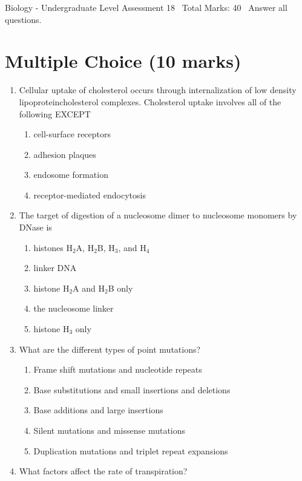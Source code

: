 \documentclass[12pt]{article}
\begin{document}
\begin{center}
Biology - Undergraduate Level Assessment 18 \
Total Marks: 40 \
Answer all questions.
\end{center}

\section*{Multiple Choice (10 marks)}
\begin{enumerate}[label=\arabic*.]
\item Cellular uptake of cholesterol occurs through internalization of low density lipoproteincholesterol complexes. Cholesterol uptake involves all of the following EXCEPT
\begin{enumerate}[label=(\alph*)]
    \item cell-surface receptors
    \item adhesion plaques
    \item endosome formation
    \item receptor-mediated endocytosis
\end{enumerate}
\item The target of digestion of a nucleosome dimer to nucleosome monomers by DNase is
\begin{enumerate}[label=(\alph*)]
    \item histones H$_{2}$A, H$_{2}$B, H$_{3}$, and H$_{4}$
    \item linker DNA
    \item histone H$_{2}$A and H$_{2}$B only
    \item the nucleosome linker
    \item histone H$_{3}$ only
\end{enumerate}
\item What are the different types of point mutations?
\begin{enumerate}[label=(\alph*)]
    \item Frame shift mutations and nucleotide repeats
    \item Base substitutions and small insertions and deletions
    \item Base additions and large insertions
    \item Silent mutations and missense mutations
    \item Duplication mutations and triplet repeat expansions
\end{enumerate}
\item What factors affect the rate of transpiration?
\begin{enumerate}[label=(\alph*)]

\end{enumerate}
\end{enumerate}
\end{document}
